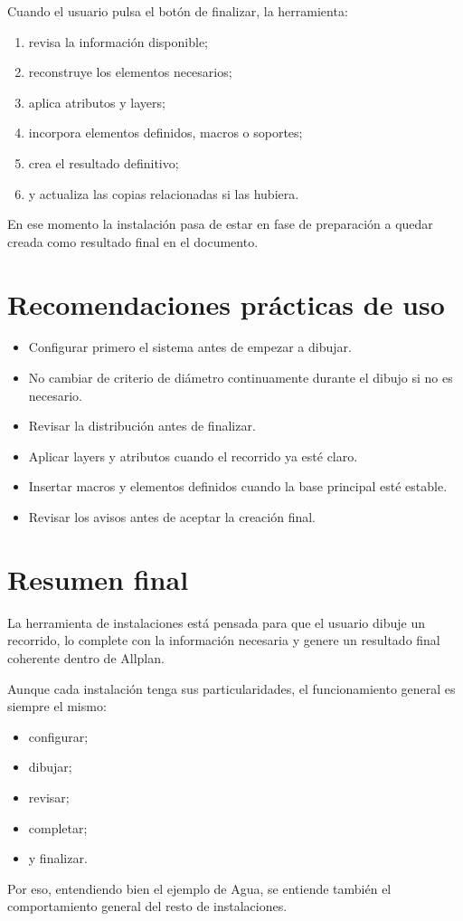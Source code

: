 Cuando el usuario pulsa el botón de finalizar, la herramienta:

\begin{enumerate}
\item revisa la información disponible;
\item reconstruye los elementos necesarios;
\item aplica atributos y layers;
\item incorpora elementos definidos, macros o soportes;
\item crea el resultado definitivo;
\item y actualiza las copias relacionadas si las hubiera.
\end{enumerate}

En ese momento la instalación pasa de estar en fase de preparación a quedar creada como resultado final en el documento.

\section{Recomendaciones prácticas de uso}

\begin{itemize}
\item Configurar primero el sistema antes de empezar a dibujar.
\item No cambiar de criterio de diámetro continuamente durante el dibujo si no es necesario.
\item Revisar la distribución antes de finalizar.
\item Aplicar layers y atributos cuando el recorrido ya esté claro.
\item Insertar macros y elementos definidos cuando la base principal esté estable.
\item Revisar los avisos antes de aceptar la creación final.
\end{itemize}

\section{Resumen final}

La herramienta de instalaciones está pensada para que el usuario dibuje un recorrido, lo complete con la información necesaria y genere un resultado final coherente dentro de Allplan.

Aunque cada instalación tenga sus particularidades, el funcionamiento general es siempre el mismo:

\begin{itemize}
\item configurar;
\item dibujar;
\item revisar;
\item completar;
\item y finalizar.
\end{itemize}

Por eso, entendiendo bien el ejemplo de Agua, se entiende también el comportamiento general del resto de instalaciones.

